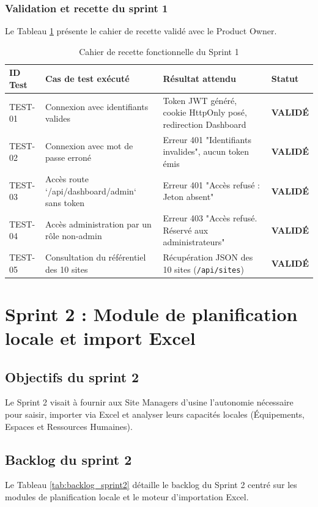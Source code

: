 \subsubsection{Validation et recette du sprint 1}
Le Tableau \ref{tab:recette_s1_ch3} présente le cahier de recette validé avec le Product Owner.

\begin{table}[h]
\centering
\begin{tabular}{|p{1.5cm}|p{4.5cm}|p{5cm}|p{2.5cm}|}
\hline
\textbf{ID Test} & \textbf{Cas de test exécuté} & \textbf{Résultat attendu} & \textbf{Statut} \\ \hline
TEST-01 & Connexion avec identifiants valides & Token JWT généré, cookie HttpOnly posé, redirection Dashboard & \textbf{VALIDÉ} \\ \hline
TEST-02 & Connexion avec mot de passe erroné & Erreur 401 "Identifiants invalides", aucun token émis & \textbf{VALIDÉ} \\ \hline
TEST-03 & Accès route `/api/dashboard/admin` sans token & Erreur 401 "Accès refusé : Jeton absent" & \textbf{VALIDÉ} \\ \hline
TEST-04 & Accès administration par un rôle non-admin & Erreur 403 "Accès refusé. Réservé aux administrateurs" & \textbf{VALIDÉ} \\ \hline
TEST-05 & Consultation du référentiel des 10 sites & Récupération JSON des 10 sites (\texttt{/api/sites}) & \textbf{VALIDÉ} \\ \hline
\end{tabular}
\caption{Cahier de recette fonctionnelle du Sprint 1}
\label{tab:recette_s1_ch3}
\end{table}


\section{Sprint 2 : Module de planification locale et import Excel}

\subsection{Objectifs du sprint 2}
Le Sprint 2 visait à fournir aux Site Managers d'usine l'autonomie nécessaire pour saisir, importer via Excel et analyser leurs capacités locales (Équipements, Espaces et Ressources Humaines).

\subsection{Backlog du sprint 2}
Le Tableau \ref{tab:backlog_sprint2} détaille le backlog du Sprint 2 centré sur les modules de planification locale et le moteur d'importation Excel.

